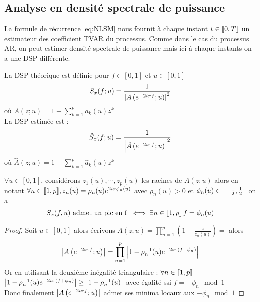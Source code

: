 \documentclass[a4paper,french]{article}
\begin{document}
\subsection{Analyse en densité spectrale de puissance}
La formule de récurrence \eqref{eq:NLSM} nous fournit à chaque instant $t\in { \left\llbracket 0,T \right\rrbracket}$ un estimateur des coefficient TVAR du processus. Comme dans le cas du processus AR, on peut estimer densité spectrale de puissance mais ici à chaque instants on a une DSP différente.
\begin{Def}[DSP]
La DSP théorique est définie pour $f \in [0,1]$ et $u\in [0,1]$ 
$$
S_x(f ; u) = \frac{1}{{ \left| A\left( e^{-2i\pi f} ; u \right) \right|}^2}
$$
où $A(z;u) = 1 - \sum_{k=1}^p a_k(u) z^k$ \\
La DSP estimée est : 
$$
\hat{S}_x(f ; u) = \frac{1}{{ \left| \hat{A}\left( e^{-2i\pi f} ; u \right) \right|}^2}
$$
où $\hat{A}(z;u) = 1 - \sum_{k=1}^p \hat{a}_k(u) z^k$
\end{Def}
\begin{Prop}
$\forall u \in [0,1]$, considérons $z_1(u),\cdots, z_p(u)$ les racines de $A(z;u)$ alors en notant $\forall n\in { \left\llbracket 1,p \right\rrbracket}, z_n(u) = \rho_n(u) e^{2i\pi \phi_n(u)}$ avec $\rho_n(u) >0$ et $\phi_n(u) \in { \left[ -\frac{1}{2},\frac{1}{2} \right]}$ on a 
$$
S_x(f,u) \text{ admet un pic en f } \iff \exists n\in { \left\llbracket 1,p \right\rrbracket} \, f = \phi_n(u)
$$
\end{Prop}
\begin{proof}
Soit $u\in [0,1]$ alors écrivons $A(z;u) = \prod_{n=1}^p (1 - \frac{z}{z_n(u)}) = $ alors
$$
{ \left| A\left( e^{-2i\pi f} ; u \right) \right|} = \prod_{n=1}^p { \left| 1 - \rho_n^{-1}(u) e^{-2i\pi (f+\phi_n)} \right|}
$$
Or en utilisant la deuxième inégalité triangulaire : $\forall n \in { \left\llbracket 1,p \right\rrbracket}$ ${ \left| 1 - \rho_n^{-1}(u) e^{-2i\pi (f+\phi_n)} \right|} \geq { \left| 1 - \rho_n^{-1}(u) \right|}$ avec égalité ssi $f = -\phi_n \mod 1$ \\
Donc finalement ${ \left| A\left( e^{-2i\pi f} ; u \right) \right|}$ admet ses minima locaux aux $-\phi_n \mod 1$
\end{proof}
\end{document}

